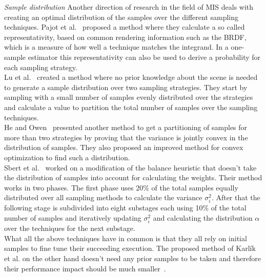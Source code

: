\textit{Sample distribution} Another direction of research in the field of MIS deals with creating an optimal distribution of the samples over the different sampling techniques.
Pajot et al.~\cite{pajot} proposed a method where they calculate a so called representativity,
based on common rendering information such as the BRDF,
which is a measure of how well a technique matches the integrand.
In a one-sample estimator this representativity can also be used to derive a probability for each sampling strategy.\\
Lu et al.~\cite{lu} created a method where no prior knowledge about the scene is needed to generate a sample distribution over two sampling strategies.
They start by sampling with a small number of samples evenly distributed over the strategies
and calculate a value to partition the total number of samples over the sampling techniques.\\
He and Owen~\cite{he} presented another method to get a partitioning of samples for more than two strategies
by proving that the variance is jointly convex in the distribution of samples.
They also proposed an improved method for convex optimization to find such a distribution.\\
Sbert et al.~\cite{sbert} worked on a modification of the balance heuristic that doesn't take the distribution of samples into account for calculating the weights.
Their method works in two phases.
The first phase uses 20\% of the total samples equally distributed over all sampling methods to calculate the variance $ \sigma^2_i $.
After that the following stage is subdivided into eight substages each using 10\% of the total number of samples
and iteratively updating $ \sigma^2_i $ and calculating the distribution $ \alpha $ over the techniques for the next substage.\\
What all the above techniques have in common is that they all rely on initial samples to fine tune their succeeding execution.
The proposed method of Karl\'ik et al. on the other hand doesn't need any prior samples to be taken and therefore their performance impact should be much smaller~\cite{Karlik2019}.

